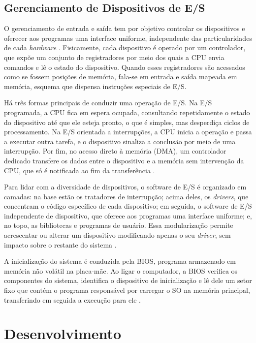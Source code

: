 \documentclass[
	12pt,				%
	openright,			%
	a4paper,			%
	english,			%
	french,				%
	spanish,			%
	brazilian,				%
	]{abntex2}
\begin{document}
\section{Gerenciamento de Dispositivos de E/S}
O gerenciamento de entrada e saída tem por objetivo controlar os dispositivos e oferecer
aos programas uma interface uniforme, independente das particularidades de cada
\emph{hardware} \cite{tanenbaum2016}. Fisicamente, cada dispositivo é operado por um
controlador, que expõe um conjunto de registradores por meio dos quais a CPU envia
comandos e lê o estado do dispositivo. Quando esses registradores são acessados como se
fossem posições de memória, fala-se em entrada e saída mapeada em memória, esquema que dispensa instruções
especiais de E/S.

Há três formas principais de conduzir uma operação de E/S. Na E/S programada, a CPU fica em espera ocupada, consultando repetidamente o
estado do dispositivo até que ele esteja pronto, o que é simples, mas desperdiça
ciclos de processamento. Na E/S orientada a interrupções, a CPU inicia a operação
e passa a executar outra tarefa, e o dispositivo sinaliza a conclusão por meio de
uma interrupção. Por fim, no acesso direto à memória (DMA), um controlador
dedicado transfere os dados entre o dispositivo e a memória sem intervenção da
CPU, que só é notificada ao fim da transferência \cite{tanenbaum2016}.

Para lidar com a diversidade de dispositivos, o software de E/S é organizado em
camadas: na base estão os tratadores de interrupção; acima deles, os \emph{drivers},
que concentram o código específico de cada dispositivo; em seguida, o software de
E/S independente de dispositivo, que oferece aos programas uma interface uniforme;
e, no topo, as bibliotecas e programas de usuário. Essa modularização permite
acrescentar ou alterar um dispositivo modificando apenas o seu \emph{driver}, sem
impacto sobre o restante do sistema \cite{tanenbaum2016}.

A inicialização do sistema é conduzida pela BIOS, programa armazenado em memória
não volátil na placa-mãe. Ao ligar o computador, a BIOS verifica os componentes do
sistema, identifica o dispositivo de inicialização e lê dele um setor fixo que
contém o programa responsável por carregar o SO na memória principal, transferindo
em seguida a execução para ele \cite{tanenbaum2016}.
 
\chapter{Desenvolvimento}
\label{cap:desenvolvimento}
 
\end{document}
